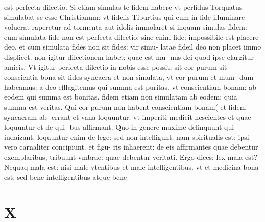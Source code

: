 \documentclass{article}
\begin{document}
\begin{pages}
est perfecta dilectio. Si etiam simulas te fidem habere vt perfidus Torquatus simulabat se esse Christianum: vt fidelis Tiburtius qui eum in fide illuminare voluerat raperetur ad tormenta aut idolis immolaret si inquam simulas fidem: eum simulata fide non est perfecta dilectio. sine enim fide: impossibile est placere deo. et cum simulata fides non sit fides: vir simu- latae fideil deo non placet immo displicet. non igitur dilectionem habet: quae est mu- nus dei quod ipse elargitur amicis. Vt igitur perfecta dilectio in nobis esse possit: sit cor purum sit conscientia bona sit fides syncaera et non simulata, vt cor purum et mum- dum habeamus: a deo efflagitemus qui summa est puritas. vt conscientiam bonam: ab eodem qui summa est bonitas. fidem etiam non simulatam ab eodem: quia summa est veritas. Qui cor purum non habent conscientiam bonam( et fidem syncaeram ab- errant et vana loquuntur: vt imperiti medicit nescientes et quae loquuntur et de qui- bus affirmant. Quo in genere maxime delinquunt qui iudaizant. loquuntur enim de lege: sed non intelligunt. nam spiritualis est: ipsi vero carnaliter concipiunt. et figu- ris inhaerent: de eis affirmantes quae debentur exemplaribus, tribuunt vmbrae: quae debentur veritati. Ergo dices: lex mala est? Nequaq mala est: nisi male vtentibus  et male intelligentibus. vt et medicina bona est: sed bene intelligentibus atque bene  \pend
\section*{X }

\end{pages}
\end{document}
